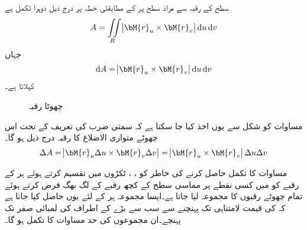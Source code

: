 سطح  کے رقبہ  سے مراد  سطح پر  کے مطابقتی خطہ  پر درج ذیل دوہرا تکمل ہے
\begin{align}\label{مساوات_خطی_تکمل_رقبہ_الف}
A=\iint\limits_R \abs{\bM{r}_u\times \bM{r}_v}\dif u\dif v
\end{align}  
جہاں
\begin{align}\label{مساوات_خطی_تکمل_رقبہ_ب}
\dif A=\abs{\bM{r}_u\times \bM{r}_v}\dif u\dif v
\end{align}
 کہلاتا ہے۔
\begin{figure}
\centering
{}
\caption{چھوٹا رقبہ}
\label{شکل_خطی_تکمل_چھوٹا_رقبہ}
\end{figure}

مساوات   کو شکل  سے یوں اخذ کیا جا سکتا ہے کہ سمتی ضرب کی تعریف کے تحت اس چھوٹے متوازی الاضلاع کا رقبہ درج ذیل ہو گا۔
\begin{align*}
\Delta A=\abs{\bM{r}_u\Delta u\times \bM{r}_v\Delta v}=\abs{\bM{r}_u\times \bM{r}_v}\Delta u\Delta v
\end{align*}

مساوات    کا تکمل حاصل کرنے کی خاطر  کو ، ، ٹکڑوں میں تقسیم کرتے ہوئے  ہر  کے رقبے کو  میں کسی نقطے پر  مماسی سطح کے کچھ رقبے کے لگ بھگ فرض کرتے ہوئے تمام چھوٹے رقبوں کا مجموعہ لیا جاتا ہے۔ایسا مجموعہ ہر  کے لئے  یوں حاصل کیا جاتا ہے کہ   کی قیمت لامتناہی تک پہنچنے سے  سب سے بڑے  کے اطراف کی لمبائی صفر تک پہنچے۔ان مجموعوں کی حد مساوات    کا تکمل ہو گا۔

